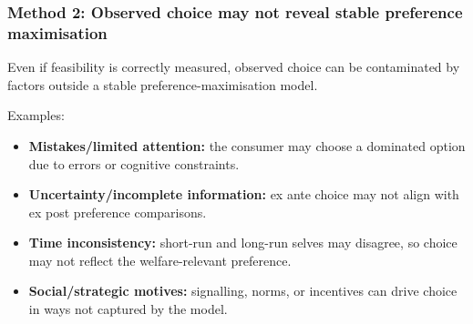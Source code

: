 \documentclass[12pt]{article}
\begin{document}
\subsubsection*{Method 2: Observed choice may not reveal stable preference maximisation}
Even if feasibility is correctly measured, observed choice can be contaminated by factors outside a stable preference-maximisation model.

Examples:
\begin{itemize}[leftmargin=*]
\item \textbf{Mistakes/limited attention:} the consumer may choose a dominated option due to errors or cognitive constraints.
\item \textbf{Uncertainty/incomplete information:} ex ante choice may not align with ex post preference comparisons.
\item \textbf{Time inconsistency:} short-run and long-run selves may disagree, so choice may not reflect the welfare-relevant preference.
\item \textbf{Social/strategic motives:} signalling, norms, or incentives can drive choice in ways not captured by the model.
\end{itemize}
\end{document}
